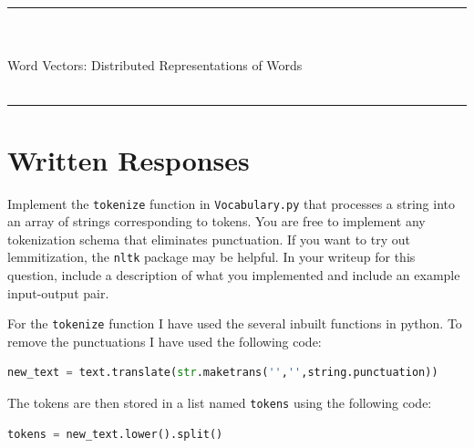\documentclass[a4paper,10pt]{article}
\begin{document}
\sffamily

\begin{center}
\noindent\rule{\textwidth}{1pt}\\[10pt]
{\color{blue!60}{AI539 Natural Language Processing with Deep Learning -- Homework 1}}\\[10pt]
{\LARGE Word Vectors: Distributed Representations of Words}\\[10pt]
{\color{blue!60}{Ameyassh Nagarajan}}\\[10pt]
\noindent\rule{\textwidth}{1pt}
\end{center}

\section{Written Responses}
\vspace{5pt}
\begin{taskbox}
 Implement the \texttt{tokenize} function in \texttt{Vocabulary.py} that processes a string into an array of strings corresponding to tokens. You are free to implement any tokenization schema that eliminates punctuation. If you want to try out lemmitization, the \texttt{nltk} package may be helpful. In your writeup for this question, include a description of what you implemented and include an example input-output pair.
\end{taskbox}
\begin{answerbox}
     For the \texttt{tokenize} function I have used the several inbuilt functions in python. To remove the punctuations I have used the following code:
    \newline
    \begin{lstlisting}[language=Python]
        new_text = text.translate(str.maketrans('','',string.punctuation))
    \end{lstlisting}
    
    The tokens are then stored in a list named \texttt{tokens} using the following code:
    \newline
    \begin{lstlisting}[language=Python]
        tokens = new_text.lower().split()
    \end{lstlisting}
\end{answerbox}
\vspace{5pt}
\end{document}
